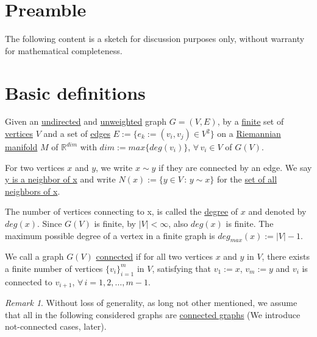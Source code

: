 \documentclass{article}
\newtheorem*{theorem A}{Theorem A}
\newtheorem*{theorem B}{N\"olker's Theorem}
\theoremstyle{remark}
\newtheorem{remark}{Remark}[section]
\theoremstyle{remark}
\begin{document}
\section*{Preamble}
\label{s:preamble}
The following content is a sketch for discussion purposes only, without warranty for mathematical completeness.
\section{Basic definitions}
\label{s:basicdefinitions}
Given an \underline{undirected} and \underline{unweighted} graph $G = \left(V, E\right)$, by a \underline{finite} set of \underline{vertices} $V$ and a set of \underline{edges} $E := \{ e_{k} := \left(v_{i}, v_{j}\right) \in V^{2}\}$ on a \underline{Riemannian manifold} $M$ of $\mathbb{R}^{dim}$ with $dim := max\{ deg\left(v_{i}\right) \}$, $\forall \, v_{i} \in V$ of $G\left(V\right)$.

\vspace{0.3cm}
For two vertices $x$ and $y$, we write $x \sim y$ if they are connected by an edge. We say \underline{y is a neighbor of x} and write $N\left(x\right) := \{ y \in V \, : \, y \sim x \}$ for the \underline{set of all neighbors of x}.

\vspace{0.3cm}
The number of vertices connecting to x, is called the \underline{degree} of $x$ and denoted by \underline{$deg\left(x\right)$}. Since $G\left(V\right)$ is finite, by $|V| < \infty$, also $deg\left(x\right)$ is finite. The maximum possible degree of a vertex in a finite graph is $deg_{max}\left(x\right) := |V| - 1$.

\vspace{0.3cm}
We call a graph $G\left(V\right)$ \underline{connected} if for all two vertices $x$ and $y$ in $V$, there exists a finite number of vertices $\{ v_{i} \}_{i=1}^{m}$ in $V$, satisfying that $v_{1} := x$, $v_{m} := y$ and $v_{i}$ is connected to $v_{i+1}$, $\forall \, i = 1,2,\dots, m-1$.


\vspace{0.3cm}
\begin{remark}
    Without loss of generality, as long not other mentioned, we assume that all in the following considered graphs are \underline{connected graphs} (We introduce not-connected cases, later).
\label{remark:connectedgraphs}
\end{remark} 
\end{document}
